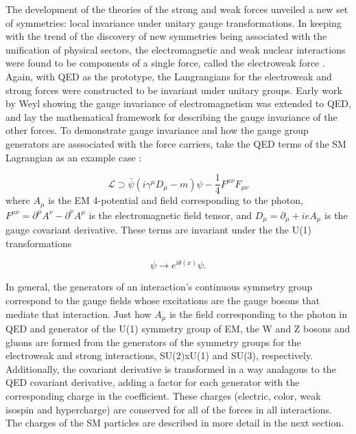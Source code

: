 \indent The development of the theories of the strong and weak forces unveiled a new set of symmetries: local invariance under unitary gauge transformations. In keeping with the trend of the discovery of new symmetries being associated with the unification of physical sectors, the electromagnetic and weak nuclear interactions were found to be components of a single force, called the electroweak force \cite{Glashow:1961tr, PhysRevLett.19.1264}. Again, with QED as the prototype, the Langrangians for the electroweak and strong forces were constructed to be invariant under unitary groups. Early work by Weyl \cite{Weyl:1927vd} showing the gauge invariance of electromagnetism was extended to QED, and lay the mathematical framework for describing the gauge invariance of the other forces. To demonstrate gauge invariance and how the gauge group generators are asssociated with the force carriers, take the QED terms of the SM Lagrangian as an example case \cite{peskinschroeder}:

\begin{equation}
\mathcal{L} \supset \bar{\psi} ( i \gamma^\mu D_\mu - m ) \psi - \frac{1}{4} F^{\mu\nu}F_{\mu\nu}
\end{equation}
where $A_\mu$ is the EM 4-potential and field corresponding to the photon, $F^{\mu\nu} = \partial^\mu A ^\nu - \partial^\nu A^\mu$ is the electromagnetic field tensor, and $D_\mu = \partial_\mu + i e A_\mu$ is the gauge covariant derivative. These terms are invariant under the the U(1) transformations

\begin{equation}
\psi \rightarrow e^{i\theta(x)} \psi.
\end{equation}

In general, the generators of an interaction's continuous symmetry group correspond to the gauge fields whose excitations are the gauge bosons that mediate that interaction. Just how $A_\mu$ is the field corresponding to the photon in QED and generator of the U(1) symmetry group of EM, the W and Z bosons and gluons are formed from the generators of the symmetry groups for the electroweak and strong interactions, SU(2)xU(1) and SU(3), respectively. Additionally, the covariant derivative is transformed in a way analagous to the QED covariant derivative, adding a factor for each generator with the corresponding charge in the coefficient. These charges (electric, color, weak isospin and hypercharge) are conserved for all of the forces in all interactions\cite{Bettini}. The charges of the SM particles are described in more detail in the next section.

